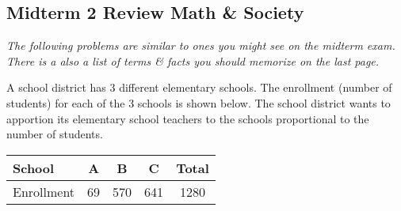 \documentclass[11pt,answers]{exam}
\begin{document}
\pagestyle{empty}
\graphicspath{{/home/brian/Dropbox/HSC/Spring16/Math111/}}

\subsection*{Midterm 2 Review \hfill Math \& Society}

\textit{The following problems are similar to ones you might see on the midterm exam. There is a also a list of terms \& facts you should memorize on the last page.}

\begin{questions}

\question A school district has 3 different elementary schools.  The enrollment (number of students) for each of the 3 schools is shown below. The school district wants to apportion its elementary school teachers to the schools proportional to the number of students.
\begin{center}
\begin{tabular}{l|ccc|c}
School & A & B & C & Total \\ \hline
Enrollment & 69 & 570 & 641 & 1280 
\end{tabular}
\end{center}

\end{questions}
\end{document}
